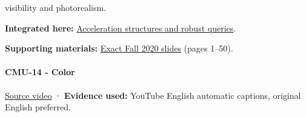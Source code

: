 visibility and photorealism.

\textbf{Integrated here:} \hyperref[04-visual-computing-ii-ch029]{Acceleration structures and robust queries}.

\textbf{Supporting materials:} \href{https://15462.courses.cs.cmu.edu/fall2020content/lectures/13_spatialdatastructures/13_spatialdatastructures_slides.pdf}{Exact Fall 2020 slides} (pages 1--50).

\paragraph{CMU-14 - Color}\label{cmu-14---color}

\href{https://www.youtube.com/watch?v=77WBg0Mprt0}{Source video} · \textbf{Evidence used:} YouTube English automatic captions, original English preferred.

